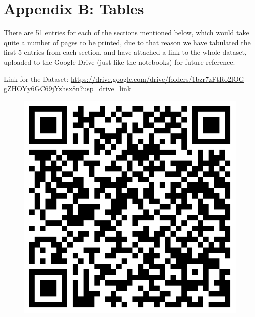 \clearpage
\appendix
{}
{}
\chapter*{Appendix B: Tables}

There are 51 entries for each of the sections mentioned below, which would take quite a number of pages to be printed, due to that reason we have tabulated the first 5 entries from each section, and have attached a link to the whole dataset, uploaded to the Google Drive (just like the notebooks) for future reference.

Link for the Dataset: \href{https://drive.google.com/drive/folders/1bzr7zFtRo2lOGgZHOYy6GC69jYzhsx8n?usp=drive_link}{https://drive.google.com/drive/folders/1bzr7zFtRo2lOG\\gZHOYy6GC69jYzhsx8n?usp=drive\_link}

\begin{figure}[h]
    \centering
    \includegraphics[width=0.2\linewidth]{images/data_sheets_qr.png}
\end{figure}

\singlespacing
